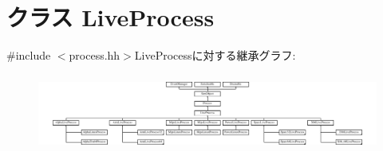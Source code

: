 \hypertarget{classLiveProcess}{
\section{クラス LiveProcess}
\label{classLiveProcess}
}


{\ttfamily \#include $<$process.hh$>$}LiveProcessに対する継承グラフ:\begin{figure}[H]
\begin{center}
\leavevmode
\includegraphics[height=2.58235cm]{classLiveProcess}
\end{center}
\end{figure}
